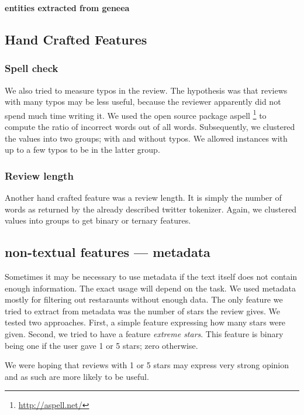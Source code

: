 \bf entities extracted from geneea \rm



\subsection{}


\subsection{Hand Crafted Features}

\subsubsection{Spell check}

We also tried to measure typos in the review.
The hypothesis was that reviews with many typos may be less useful,
because the reviewer apparently did not spend much time writing it.
We used the open source package aspell \footnote{\url{http://aspell.net/}}
to compute the ratio of incorrect words out of all words.
Subsequently, we clustered the values into two groups; with and without typos.
We allowed instances with up to a few typos to be in the latter group.

\subsubsection{Review length}

Another hand crafted feature was a review length.
It is simply the number of words as returned by the already described twitter tokenizer.
Again, we clustered values into groups to get binary or ternary features.


\subsection{non-textual features --- metadata}

Sometimes it may be necessary to use metadata
if the text itself does not contain enough information.
The exact usage will depend on the task.
We used metadata mostly for filtering out restaraunts without enough data.
The only feature we tried to extract from metadata was the number of stars the review gives.
We tested two approaches.
First, a simple feature expressing how many stars were given.
Second, we tried to have a feature \textit{extreme stars}.
This feature is binary being one if the user gave 1 or 5 stars;
zero otherwise.

We were hoping that reviews with 1 or 5 stars may express very strong opinion
and as such are more likely to be useful.

